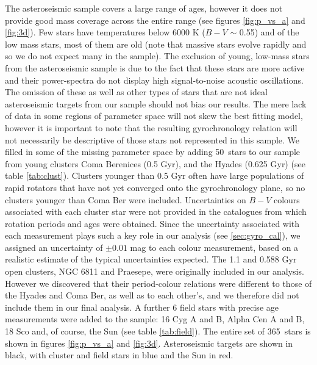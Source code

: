 \documentclass[useAMS, usenatbib]{mn2e}
\newcommand{\nHC}{50~}
\newcommand{\ntotal}{365~}
\begin{document}
The asteroseismic sample covers a large range of ages, however it does not
provide good mass coverage across the entire range (see figures
\ref{fig:p_vs_a} and \ref{fig:3d}).
Few stars have temperatures below 6000 K ($B-V$ $\sim$ 0.55) and of the low
mass stars, most of them are old (note that massive stars evolve rapidly and
so we do not expect many in the sample).
The exclusion of young, low-mass stars from the asteroseismic sample is due to
the fact that these stars are more active and their power-spectra do not
display high signal-to-noise acoustic oscillations.
The omission of these as well as other types of stars that are not ideal
asteroseismic targets from our sample should not bias our results.
The mere lack of data in some regions of parameter space will not skew the
best fitting model, however it is important to note that the resulting
gyrochronology relation will not necessarily be descriptive of those stars not represented in this sample.  %
We filled in some of the missing parameter space by adding \nHC stars to our
sample from young clusters Coma Berenices (0.5 Gyr), and the Hyades
(0.625 Gyr) (see table \ref{tab:clust}).
Clusters younger than 0.5 Gyr often have large populations of rapid rotators
that have not yet converged onto the gyrochronology plane, so no clusters
younger than Coma Ber were included.
Uncertainties on $B-V$ colours associated with each cluster star were not
provided in the catalogues from which rotation periods and ages were obtained.
Since the uncertainty associated with each measurement plays such a key role
in our analysis (see \textsection \ref{sec:gyro_cal}), we assigned an
uncertainty of
$\pm 0.01$ %
mag to each colour measurement, based on a realistic estimate of the
typical uncertainties expected.
The 1.1 and 0.588 Gyr open clusters, NGC 6811 and Praesepe, were originally
included in our analysis.
However we discovered that their period-colour relations were different to
those of the Hyades and Coma Ber, as well as to each other's, and we therefore
did not include them in our final analysis.
A further 6 field stars with precise age measurements were added to the
sample: 16 Cyg A and B, Alpha Cen A and B, 18 Sco and, of course, the Sun
(see table \ref{tab:field}).
The entire set of \ntotal stars is shown in figures \ref{fig:p_vs_a} and
\ref{fig:3d}.
Asteroseismic targets are shown in black, with cluster and field stars in blue
and the Sun in red.
\end{document}
